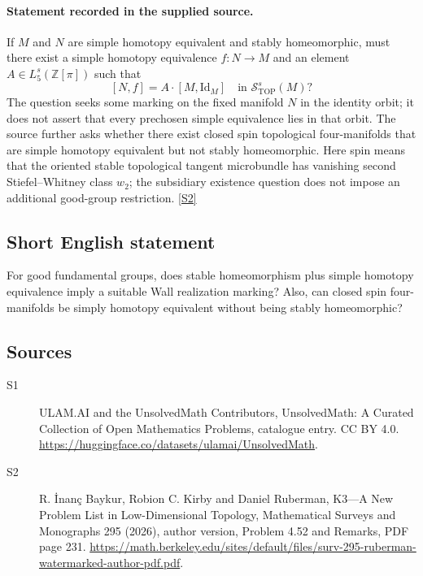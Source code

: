 \documentclass[11pt]{article}
\newcommand{\sref}[2]{\hyperlink{source:#1:#2}{[S#2]}}
\begin{document}
\paragraph{Statement recorded in the supplied source.}
If $M$ and $N$ are simple homotopy equivalent and stably homeomorphic, must there exist a simple homotopy equivalence $f:N\to M$ and an element $A\in L_5^s(\mathbb Z[\pi])$ such that
\[
[N,f]=A\cdot[M,\mathrm{Id}_M]\quad\text{in }\mathcal S^s_{\mathrm{TOP}}(M)?
\]
The question seeks some marking on the fixed manifold $N$ in the identity orbit; it does not assert that every prechosen simple equivalence lies in that orbit. The source further asks whether there exist closed spin topological four-manifolds that are simple homotopy equivalent but not stably homeomorphic. Here spin means that the oriented stable topological tangent microbundle has vanishing second Stiefel--Whitney class $w_2$; the subsidiary existence question does not impose an additional good-group restriction. \sref{statement}{2}
\subsection{Short English statement}
For good fundamental groups, does stable homeomorphism plus simple homotopy equivalence imply a suitable Wall realization marking? Also, can closed spin four-manifolds be simply homotopy equivalent without being stably homeomorphic?
\subsection{Sources}
\begin{description}
\item[\hypertarget{source:statement:1}{S1}] ULAM.AI and the UnsolvedMath Contributors, UnsolvedMath: A Curated Collection of Open Mathematics Problems, catalogue entry. CC BY 4.0. \url{https://huggingface.co/datasets/ulamai/UnsolvedMath}.
\item[\hypertarget{source:statement:2}{S2}] R. İnanç Baykur, Robion C. Kirby and Daniel Ruberman, K3—A New Problem List in Low-Dimensional Topology, Mathematical Surveys and Monographs 295 (2026), author version, Problem 4.52 and Remarks, PDF page 231. \url{https://math.berkeley.edu/sites/default/files/surv-295-ruberman-watermarked-author-pdf.pdf}.
\end{description}
\label{end:statement}
\end{document}
